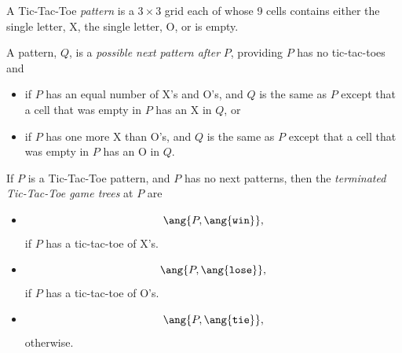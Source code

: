 \begin{definition}

\begin{definition}

A Tic-Tac-Toe \emph{pattern} is a $3 \times 3$ grid each of whose 9 cells
contains either the single letter, X, the single letter, O, or is
empty.

A pattern, $Q$, is a \emph{possible next pattern after} $P$, providing $P$
has no tic-tac-toes and
\begin{itemize}

\item if $P$ has an equal number of X's and O's, and $Q$ is the same as
$P$ except that a cell that was empty in $P$ has an X in $Q$, or

\item if $P$ has one more X than O's, and $Q$ is the same as $P$ except
that a cell that was empty in $P$ has an O in $Q$.
\end{itemize}

If $P$ is a Tic-Tac-Toe pattern, and $P$ has no next patterns, then the
\emph{terminated Tic-Tac-Toe game trees} at $P$ are

\begin{itemize}

\item 
\[
\ang{P, \ang{\texttt{win}}},
\]
if $P$ has a tic-tac-toe of X's.


\item 
\[
\ang{P, \ang{\texttt{lose}}},
\]
if $P$ has a tic-tac-toe of O's.


\item
\[
\ang{P, \ang{\texttt{tie}}},
\]
otherwise.


\end{itemize}
\end{definition}
\end{definition}

